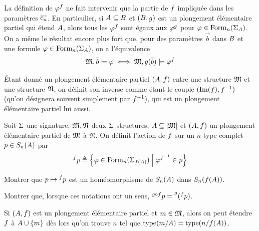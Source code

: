 \begin{remark}
  La définition de $\varphi^{f}$ ne fait intervenir que la partie de
  $f$ impliquée dans les paramètres $\overline{\mathrm{c}_a}$. En particulier, si
  $A\subseteq B$ et $(B,g)$ est un plongement élémentaire
  partiel qui étend $A$, alors tous les $\varphi^{f}$ sont égaux aux
  $\varphi^{g}$ pour $\varphi\in\operatorname{Form}_n(\Sigma_{A})$. On a même le
  résultat encore plus fort que, pour des paramètres $\vec{b}$ dans
  $B$ et une formule $\varphi\in\operatorname{Form}_n(\Sigma_{A})$, on a
  l'équivalence
  \[\mathfrak{M},\overline{b} \models\varphi \iff
  \mathfrak{M},g(\overline{b})\models\varphi^{f}\]
\end{remark}

\begin{notation}
  \'Etant donné un plongement élémentaire partiel $(A,f)$ entre
  une structure $\mathfrak{M}$ et une structure $\mathfrak{N}$, on définit son inverse
  comme étant le couple $(\operatorname{Im}(f),f^{-1})$ (qu'on désignera souvent
  simplement par $f^{-1}$), qui est un plongement élémentaire partiel
  lui aussi.
\end{notation}

\begin{definition}
  Soit $\Sigma$ une signature, $\mathfrak{M},\mathfrak{N}$ deux $\Sigma$-structures,
  $A\subseteq\left\vert \mathfrak{M}\right\vert$ et $(A,f)$ un plongement élémentaire
  partiel de $\mathfrak{M}$ à $\mathfrak{N}$. On définit l'action de $f$ sur un
  $n$-type complet $p\in S_{n}(A)$ par
  \[\prescript{f}{}{p} \triangleq
  \left\{ \varphi\in\operatorname{Form}_{n}(\Sigma_{f(A)}) \;\middle\vert\; \varphi^{f^{-1}}\in p \right\}\]
\end{definition}

\begin{exercise}
  Montrer que $p\mapsto \prescript{f}{}{p}$ est un
  homéomorphisme de $S_{n}(A)$ dans $S_{n}(f(A))$.
\end{exercise}

\begin{exercise}
  Montrer que, lorsque ces notations ont un sens,
  $\prescript{g\circ f}{}{p} =
  \prescript{g}{}{(\prescript{f}{}{p})}$.
\end{exercise}

\begin{remark}
  Si $(A,f)$ est un plongement élémentaire partiel et $m\in\mathfrak{M}$,
  alors on peut étendre $f$ à $A\cup\{m\}$ dès lors qu'on trouve
  $n$ tel que $\operatorname{type}(m/A) = \operatorname{type}(n/f(A))$.
\end{remark}

